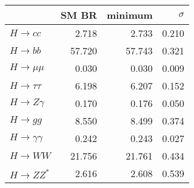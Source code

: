 \begin{tabular}{lrrr}
\toprule
{} &  SM BR &  minimum &  $\sigma$ \\
\midrule
$H\to cc$           &  2.718 &    2.733 &     0.210 \\
$H\to bb$           & 57.720 &   57.743 &     0.321 \\
$H\to \mu\mu$       &  0.030 &    0.030 &     0.009 \\
$H\to \tau\tau$     &  6.198 &    6.207 &     0.152 \\
$H\to Z\gamma$      &  0.170 &    0.176 &     0.050 \\
$H\to gg$           &  8.550 &    8.499 &     0.374 \\
$H\to \gamma\gamma$ &  0.242 &    0.243 &     0.027 \\
$H\to WW$           & 21.756 &   21.761 &     0.434 \\
$H\to ZZ^*$         &  2.616 &    2.608 &     0.539 \\
\bottomrule
\end{tabular}
